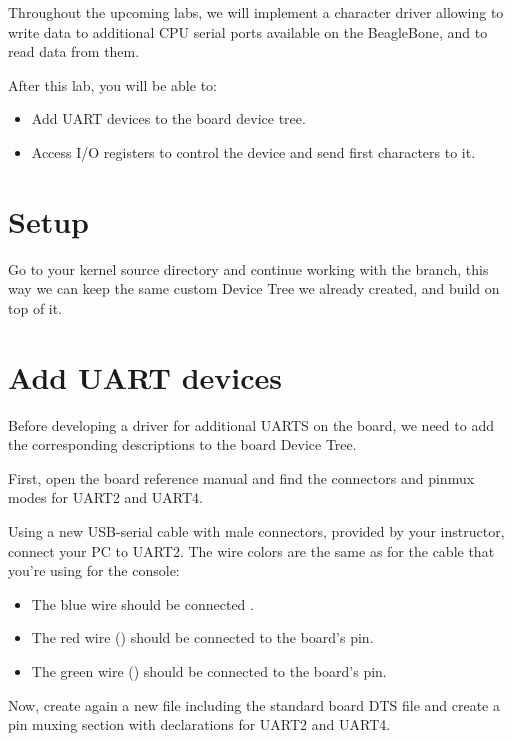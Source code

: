 
Throughout the upcoming labs, we will implement a character driver
allowing to write data to additional CPU serial ports available on
the BeagleBone, and to read data from them.

After this lab, you will be able to:

\begin{itemize}
\item Add UART devices to the board device tree.
\item Access I/O registers to control the device and
      send first characters to it.
\end{itemize}

\section{Setup}

Go to your kernel source directory and continue working with the
 branch, this way we can keep the same custom Device
Tree we already created, and build on top of it.

\section{Add UART devices}

Before developing a driver for additional UARTS on the board, we
need to add the corresponding descriptions to the board Device Tree.

First, open the board reference manual and find the connectors
and pinmux modes for UART2 and UART4.

Using a new USB-serial cable with male connectors, provided by your
instructor, connect your PC to UART2. The wire colors are the same
as for the cable that you're using for the console:

\begin{itemize}
\item The blue wire should be connected .
\item The red wire () should be connected to the board's  pin.
\item The green wire () should be connected to the board's  pin.
\end{itemize}

Now, create again a new
 file including
the standard board DTS file and create a pin muxing section with
declarations for UART2 and UART4.

